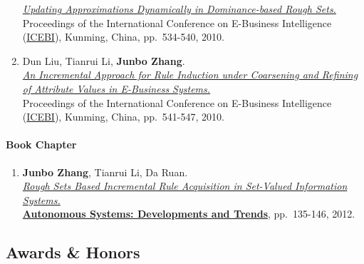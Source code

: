 \documentclass[]{article}
\begin{document}
\begin{enumerate}
  \href{http://www.atlantis-press.com/php/paper-details.php?id=2011}{\emph{Updating
  Approximations Dynamically in Dominance-based Rough Sets.}}\\
  Proceedings of the International Conference on E-Business Intelligence
  (\href{http://cnais.sem.tsinghua.edu.cn/icebi2010}{ICEBI}), Kunming,
  China, pp.~534-540, 2010.
\item
  Dun Liu, Tianrui Li, \textbf{Junbo Zhang}.\\
  \href{http://www.atlantis-press.com/php/paper-details.php?id=2070}{\emph{An
  Incremental Approach for Rule Induction under Coarsening and Refining
  of Attribute Values in E-Business Systems.}}\\ Proceedings of the
  International Conference on E-Business Intelligence
  (\href{http://cnais.sem.tsinghua.edu.cn/icebi2010}{ICEBI}), Kunming,
  China, pp.~541-547, 2010.
\end{enumerate}

\paragraph{Book Chapter}\label{book-chapter}

\begin{enumerate}
\def\labelenumi{\arabic{enumi}.}
\itemsep1pt\parskip0pt
\item
  \textbf{Junbo Zhang}, Tianrui Li, Da Ruan.\\
  \href{http://dx.doi.org/10.1007/978-3-642-24806-1_11}{\emph{Rough Sets
  Based Incremental Rule Acquisition in Set-Valued Information
  Systems.}}\\
  \href{http://www.springer.com/engineering/computational+intelligence+and+complexity/book/978-3-642-24805-4}{\textbf{Autonomous
  Systems: Developments and Trends}}, pp.~135-146, 2012.
\end{enumerate}

\subsection{Awards \& Honors}\label{awards-honors}
\end{document}
